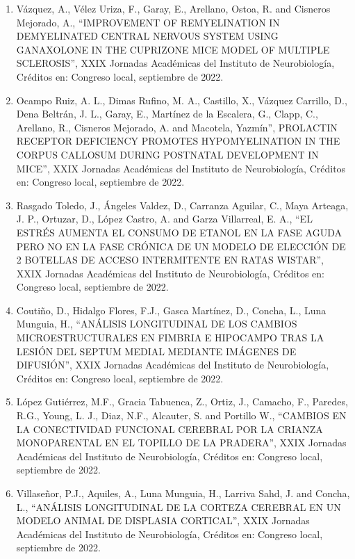 \begin{enumerate}
\item Vázquez, A., Vélez Uriza, F., Garay, E., Arellano, Ostoa, R. and Cisneros Mejorado, A., “IMPROVEMENT OF REMYELINATION IN DEMYELINATED 
CENTRAL 
NERVOUS SYSTEM USING GANAXOLONE IN THE CUPRIZONE MICE MODEL OF MULTIPLE SCLEROSIS”, XXIX Jornadas Académicas del Instituto de Neurobiología, 
Créditos en: Congreso local, septiembre de 2022.

\item Ocampo Ruiz, A. L., Dimas Rufino, M. A., Castillo, X., Vázquez Carrillo, D., Dena Beltrán, J. L., Garay, E., Martínez de la Escalera, 
G., 
Clapp, C., Arellano, R., Cisneros Mejorado, A. and Macotela, Yazmín”, PROLACTIN RECEPTOR DEFICIENCY PROMOTES HYPOMYELINATION IN THE CORPUS 
CALLOSUM DURING POSTNATAL DEVELOPMENT IN MICE”, XXIX Jornadas Académicas del Instituto de Neurobiología, Créditos en: Congreso local, 
septiembre de 2022.

\item Rasgado Toledo, J., Ángeles Valdez, D., Carranza Aguilar, C., Maya Arteaga, J. P., Ortuzar, D., López Castro, A. and Garza Villarreal, 
E. A., 
“EL ESTRÉS AUMENTA EL CONSUMO DE ETANOL EN LA FASE AGUDA PERO NO EN LA FASE CRÓNICA DE UN MODELO DE ELECCIÓN DE 2 BOTELLAS DE ACCESO 
INTERMITENTE EN RATAS WISTAR”, XXIX Jornadas Académicas del Instituto de Neurobiología, Créditos en: Congreso local, septiembre de 2022.

\item Coutiño, D., Hidalgo Flores, F.J., Gasca Martínez, D., Concha, L., Luna Munguia, H., “ANÁLISIS LONGITUDINAL DE LOS CAMBIOS 
MICROESTRUCTURALES 
EN FIMBRIA E HIPOCAMPO TRAS LA LESIÓN DEL SEPTUM MEDIAL MEDIANTE IMÁGENES DE DIFUSIÓN”, XXIX Jornadas Académicas del Instituto de 
Neurobiología, Créditos en: Congreso local, septiembre de 2022.

\item López Gutiérrez, M.F., Gracia Tabuenca, Z., Ortiz, J., Camacho, F., Paredes, R.G., Young, L. J., Diaz, N.F., Alcauter, S. and Portillo 
W., 
“CAMBIOS EN LA CONECTIVIDAD FUNCIONAL CEREBRAL POR LA CRIANZA MONOPARENTAL EN EL TOPILLO DE LA PRADERA”, XXIX Jornadas Académicas del 
Instituto de Neurobiología, Créditos en: Congreso local, septiembre de 2022.

\item Villaseñor, P.J., Aquiles, A., Luna Munguia, H., Larriva Sahd, J. and Concha, L., “ANÁLISIS LONGITUDINAL DE LA CORTEZA CEREBRAL EN UN 
MODELO 
ANIMAL DE DISPLASIA CORTICAL”, XXIX Jornadas Académicas del Instituto de Neurobiología, Créditos en: Congreso local, septiembre de 2022.


\end{enumerate}

